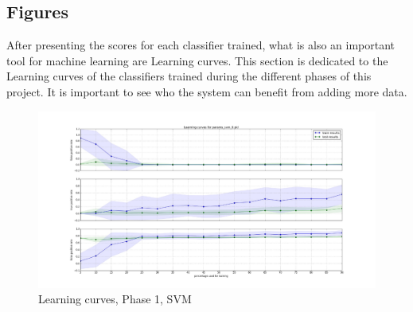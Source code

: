 \documentclass[10pt, conference, compsocconf]{IEEEtran}
\begin{document}
\subsection{Figures}

After presenting the scores for each classifier trained, what is also an important tool for machine learning are Learning curves. This section is dedicated to the Learning curves of the classifiers trained during the different phases of this project. 
It is important to see who the system can benefit from adding more data. 

\begin{figure}[h]
\vskip 0.2in
\begin{center}
\centerline{\includegraphics[width=\columnwidth, scale=1]{./Figures/Lc_Ds1_P20-80_SVM}}
\caption{Learning curves, Phase 1, SVM}
\label{learning curves}
\end{center}
\vskip -0.2in
\end{figure} 
\end{document}
